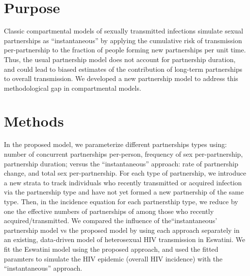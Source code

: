 \section{Purpose} %
Classic compartmental models of sexually transmitted infections
simulate sexual partnerships as ``instantaneous'' by
applying the cumulative risk of transmission per-partnership
to the fraction of people forming new partnerships per unit time. 
Thus, the usual partnership model does not account for partnership duration, %
and could lead to biased estimates of the contribution of
long-term partnerships to overall transmission.
We developed a new partnership model to address this methodological gap in compartmental models.
\section{Methods}
In the proposed model, we parameterize different partnerships types using:
number of concurrent partnerships per-person, frequency of sex per-partnership, partnership duration;
versus the ``instantaneous'' approach: rate of partnership change, and total sex per-partnership. %
For each type of partnership, we introduce a new strata to track individuals %
who recently transmitted or acquired infection via the partnership type and 
have not yet formed a new partnership of the same type.
Then, in the incidence equation for each partnersthip type, we reduce by one
the effective numbers of partnerships of among those who recently acquired/transmitted. %
We compared the influence of the``instantaneous' partnership model vs the proposed model by using each 
approach separately in an existing, data-driven model of heterosexual HIV transmission in Eswatini. 
We fit the Eswatini model using the proposed approach, 
and used the fitted paramters to simulate the HIV epidemic (overall HIV incidence) with the ``instantaneous''  approach.

